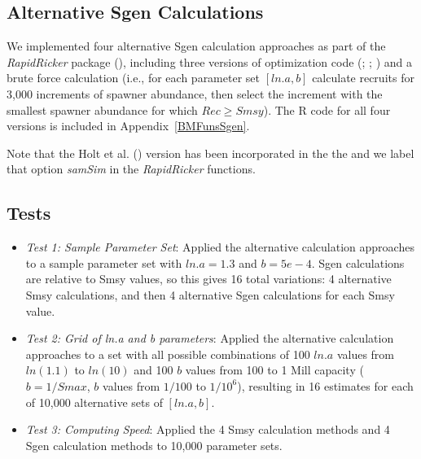 \documentclass[french,11pt]{book}
\begin{document}
\endgroup{} \endgroup{}

\subsection{Alternative Sgen Calculations}\label{alternative-sgen-calculations}

We implemented four alternative Sgen calculation approaches as part of the \emph{RapidRicker} package (), including three versions of optimization code (; ;  ) and a brute force calculation (i.e., for each parameter set \([ln.a,b]\) calculate recruits for 3,000 increments of spawner abundance, then select the increment with the smallest spawner abundance for which \(Rec \geq Smsy\)). The R code for all four versions is included in Appendix~\ref{BMFunsSgen}.

Note that the Holt et al. () version has been incorporated in the the  and we label that option \emph{samSim} in the \emph{RapidRicker} functions.

\clearpage

\subsection{Tests}\label{tests}
\begin{itemize}

\item
  \emph{Test 1: Sample Parameter Set}: Applied the alternative calculation approaches to a sample parameter set with \(ln.a = 1.3\) and \(b = 5e-4\). Sgen calculations are relative to Smsy values, so this gives 16 total variations: 4 alternative Smsy calculations, and then 4 alternative Sgen calculations for each Smsy value.
\item
  \emph{Test 2: Grid of ln.a and b parameters}: Applied the alternative calculation approaches to a set with all possible combinations of 100 \(ln.a\) values from \(ln(1.1)\) to \(ln(10)\) and 100 \(b\) values from 100 to 1 Mill capacity (\(b = 1/Smax\), \(b\) values from \(1/100\) to \(1/10^6\)), resulting in 16 estimates for each of 10,000 alternative sets of \([ln.a, b]\).\\
\item
  \emph{Test 3: Computing Speed}: Applied the 4 Smsy calculation methods and 4 Sgen calculation methods to 10,000 parameter sets.
\end{itemize}
\end{document}
